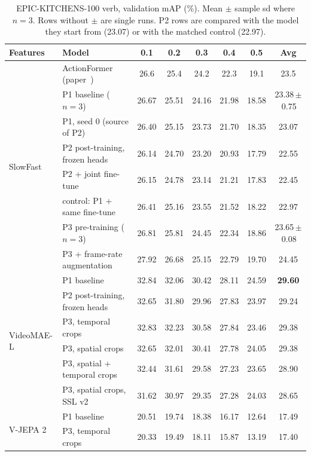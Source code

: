 \documentclass[10pt,a4paper]{article}
\begin{document}
\begin{table}[t]
\centering\small
\caption{EPIC-KITCHENS-100 verb, validation mAP (\%). Mean $\pm$ sample sd where $n{=}3$.
Rows without $\pm$ are single runs. P2 rows are compared with the model they start from
(23.07) or with the matched control (22.97).}
\label{tab:main}
\setlength{\tabcolsep}{5pt}
\begin{tabular}{llcccccc}
\toprule
Features & Model & 0.1 & 0.2 & 0.3 & 0.4 & 0.5 & Avg \\
\midrule
\multirow{8}{*}{SlowFast}
 & ActionFormer (paper~\cite{zhang2022actionformer}) & 26.6 & 25.4 & 24.2 & 22.3 & 19.1 & 23.5 \\
 & P1 baseline ($n{=}3$) & 26.67 & 25.51 & 24.16 & 21.98 & 18.58 & 23.38\,$\pm$\,0.75 \\
 & \quad P1, seed 0 (source of P2) & 26.40 & 25.15 & 23.73 & 21.70 & 18.35 & 23.07 \\
 & P2 post-training, frozen heads & 26.14 & 24.70 & 23.20 & 20.93 & 17.79 & 22.55 \\
 & P2 + joint fine-tune & 26.15 & 24.78 & 23.14 & 21.21 & 17.83 & 22.45 \\
 & \quad control: P1 + same fine-tune & 26.41 & 25.16 & 23.55 & 21.52 & 18.22 & 22.97 \\
 & P3 pre-training ($n{=}3$) & 26.81 & 25.81 & 24.45 & 22.34 & 18.86 & 23.65\,$\pm$\,0.08 \\
 & P3 + frame-rate augmentation & 27.92 & 26.68 & 25.15 & 22.79 & 19.70 & 24.45 \\
\midrule
\multirow{6}{*}{VideoMAE-L}
 & P1 baseline & 32.84 & 32.06 & 30.42 & 28.11 & 24.59 & \textbf{29.60} \\
 & P2 post-training, frozen heads & 32.65 & 31.80 & 29.96 & 27.83 & 23.97 & 29.24 \\
 & P3, temporal crops & 32.83 & 32.23 & 30.58 & 27.84 & 23.46 & 29.38 \\
 & P3, spatial crops & 32.65 & 32.01 & 30.41 & 27.78 & 24.05 & 29.38 \\
 & P3, spatial + temporal crops & 32.44 & 31.61 & 29.58 & 27.23 & 23.65 & 28.90 \\
 & P3, spatial crops, SSL v2 & 31.62 & 30.97 & 29.35 & 27.28 & 24.03 & 28.65 \\
\midrule
\multirow{2}{*}{V-JEPA 2}
 & P1 baseline & 20.51 & 19.74 & 18.38 & 16.17 & 12.64 & 17.49 \\
 & P3, temporal crops & 20.33 & 19.49 & 18.11 & 15.87 & 13.19 & 17.40 \\
\bottomrule
\end{tabular}
\end{table}
\end{document}
